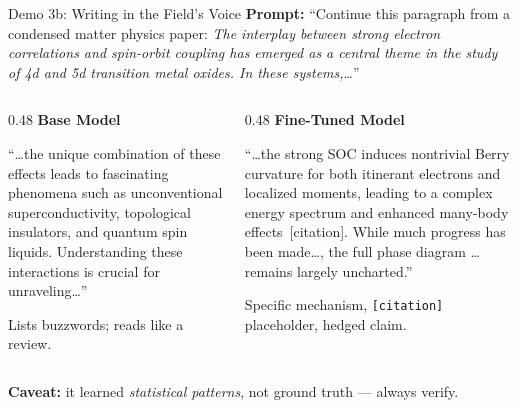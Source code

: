 \documentclass[aspectratio=169]{beamer}
\begin{document}
\begin{frame}{Demo 3b: Writing in the Field's Voice}
    \textbf{Prompt:} ``Continue this paragraph from a condensed matter physics paper: \emph{The interplay between strong electron correlations and spin-orbit coupling has emerged as a central theme in the study of 4d and 5d transition metal oxides. In these systems,}\ldots''

    \vspace{0.4em}
    \begin{columns}[T]
        \begin{column}{0.48\textwidth}
            \textbf{Base Model}
            \begin{tcolorbox}[colback=gray!10, colframe=gray!40, boxrule=0.5pt, arc=2pt, fontupper=\footnotesize]
                ``\ldots the unique combination of these effects leads to fascinating phenomena such as unconventional superconductivity, topological insulators, and quantum spin liquids. Understanding these interactions is crucial for unraveling\ldots''
            \end{tcolorbox}
            {\footnotesize\color{red} Lists buzzwords; reads like a review.}
        \end{column}
        \begin{column}{0.48\textwidth}
            \textbf{Fine-Tuned Model}
            \begin{tcolorbox}[colback=blue!5, colframe=blue!30, boxrule=0.5pt, arc=2pt, fontupper=\footnotesize]
                ``\ldots the strong SOC induces nontrivial Berry curvature for both itinerant electrons and localized moments, leading to a complex energy spectrum and enhanced many-body effects~[citation]. While much progress has been made\ldots, the full phase diagram \ldots remains largely uncharted.''
            \end{tcolorbox}
            {\footnotesize\color{green!50!black} Specific mechanism, \texttt{[citation]} placeholder, hedged claim.}
        \end{column}
    \end{columns}

    \vspace{0.3em}
    {\footnotesize\textbf{Caveat:} it learned \textit{statistical patterns}, not ground truth --- always verify.}
\end{frame}

\end{document}
